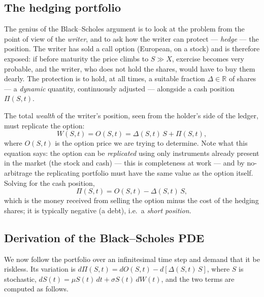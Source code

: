 \subsection{The hedging portfolio}\label{sec:hedging-portfolio}

The genius of the Black--Scholes argument is to look at the problem from the point of view of the \emph{writer}, and to ask how the writer can protect --- \emph{hedge} --- the position.
The writer has sold a call option (European, on a stock) and is therefore exposed: if before maturity the price climbs to $S\gg X$, exercise becomes very probable, and the writer, who does not hold the shares, would have to buy them dearly.
The protection is to hold, at all times, a suitable fraction $\Delta\in\mathbb{R}$ of shares --- a \emph{dynamic} quantity, continuously adjusted --- alongside a cash position $\Pi(S,t)$.

The total \emph{wealth} of the writer's position, seen from the holder's side of the ledger, must replicate the option:
\begin{equation}
W(S,t) = O(S,t) = \Delta(S,t)\, S + \Pi(S,t),
\end{equation}
where $O(S,t)$ is the option price we are trying to determine.
Note what this equation says: the option can be \emph{replicated} using only instruments already present in the market (the stock and cash) --- this is completeness at work --- and by no-arbitrage the replicating portfolio must have the same value as the option itself.
Solving for the cash position,
\begin{equation}
\Pi(S,t) = O(S,t) - \Delta(S,t)\, S,
\end{equation}
which is the money received from selling the option minus the cost of the hedging shares; it is typically negative (a debt), i.e.\ a \emph{short position}.

\subsection{Derivation of the Black--Scholes PDE}

We now follow the portfolio over an infinitesimal time step and demand that it be riskless.
Its variation is $d\Pi(S,t) = dO(S,t) - d[\Delta(S,t)\, S]$, where $S$ is stochastic, $dS(t)= \mu S(t)\, dt + \sigma S(t)\, dW(t)$, and the two terms are computed as follows.

